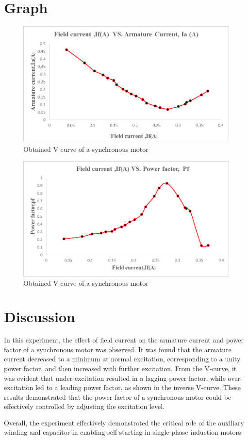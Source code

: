 \documentclass[a4paper,12pt]{article}
\begin{document}
\section{Graph}
	\begin{figure}[H]
	\centering
	\includegraphics[width=0.79\linewidth]{Images/2}
	\caption{Obtained V curve of a synchronous motor}
	\label{fig:1}
\end{figure}
\begin{figure}[H]
	\centering
	\includegraphics[width=0.79 \linewidth]{Images/1}
	\caption{Obtained V curve of a synchronous motor}
	\label{fig:2}
\end{figure}

	
	\section{Discussion}
	


In this experiment, the effect of field current on the armature current and power factor of a synchronous motor was observed. It was found that the armature current decreased to a minimum at normal excitation, corresponding to a unity power factor, and then increased with further excitation. From the V-curve, it was evident that under-excitation resulted in a lagging power factor, while over-excitation led to a leading power factor, as shown in the inverse V-curve. These results demonstrated that the power factor of a synchronous motor could be effectively controlled by adjusting the excitation level.

	
	
	Overall, the experiment effectively demonstrated the critical role of the auxiliary winding and capacitor in enabling self-starting in single-phase induction motors.
	
	
	
	
\end{document}
